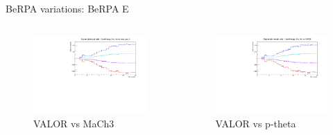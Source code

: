 \documentclass{beamer}
\begin{document}
\begin{frame}{BeRPA variations: BeRPA E}
	\centering
	\begin{columns}
		\begin{column}{0.5\paperwidth}
			\begin{figure}
				\includegraphics[page=10, trim={0cm 0cm 0cm 0cm}, clip, scale=0.35] {images/variations/valor_mach3/variations_prebanff_unosc_1Re}
				\caption{VALOR vs MaCh3}
			\end{figure}
		\end{column}
		\begin{column}{0.5\paperwidth}
			\begin{figure}
				\includegraphics[page=20, trim={0cm 0cm 0cm 0cm}, clip, scale=0.35] {images/variations/valor_ptheta/variations_prebanff_unosc_1Re}
				\caption{VALOR vs p-theta}
			\end{figure}
		\end{column}
	\end{columns}
\end{frame}
\end{document}
